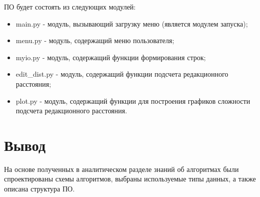 ПО будет состоять из следующих модулей:
\begin{itemize}
	\item main.py - модуль, вызывающий загрузку меню (является модулем запуска);
	\item menu.py - модуль, содержащий меню пользователя;
	\item myio.py - модуль, содержащий функции формирования строк;
	\item edit\_dist.py - модуль, содержащий функции подсчета редакционного расстояния;
	\item plot.py - модуль, содержащий функции для построения графиков сложности подсчета редакционного расстояния.
\end{itemize}

\section{Вывод}

На основе полученных в аналитическом разделе знаний об алгоритмах были спроектированы схемы алгоритмов, выбраны используемые типы данных, а также описана структура ПО.